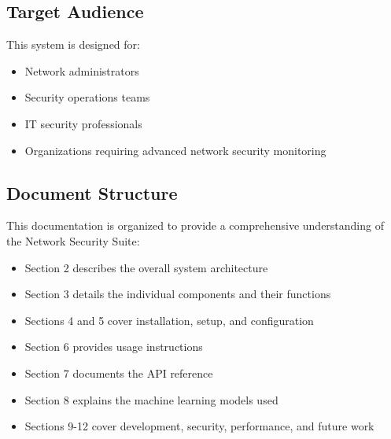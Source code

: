 \subsection{Target Audience}
This system is designed for:
\begin{itemize}
    \item Network administrators
    \item Security operations teams
    \item IT security professionals
    \item Organizations requiring advanced network security monitoring
\end{itemize}

\subsection{Document Structure}
This documentation is organized to provide a comprehensive understanding of the Network Security Suite:
\begin{itemize}
    \item Section 2 describes the overall system architecture
    \item Section 3 details the individual components and their functions
    \item Sections 4 and 5 cover installation, setup, and configuration
    \item Section 6 provides usage instructions
    \item Section 7 documents the API reference
    \item Section 8 explains the machine learning models used
    \item Sections 9-12 cover development, security, performance, and future work
\end{itemize}